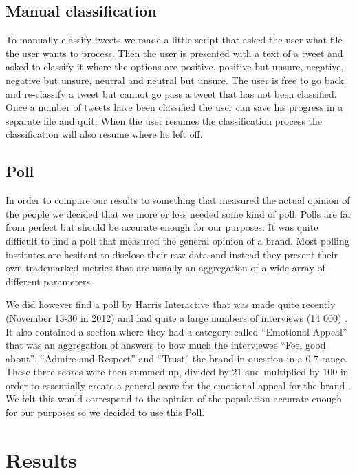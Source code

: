 \documentclass[a4paper,12pt]{report}
\begin{document}
\section{Manual classification}

To manually classify tweets we made a little script that asked the user what file the user wants to process. 
Then the user is presented with a text of a tweet and asked to classify it where the options are positive, positive but unsure, negative, negative but unsure, neutral and neutral but unsure. 
The user is free to go back and re-classify a tweet but cannot go pass a tweet that has not been classified. 
Once a number of tweets have been classified the user can save his progress in a separate file and quit. 
When the user resumes the classification process the classification will also resume where he left off.

\section{Poll}

In order to compare our results to something that measured the actual opinion of the people we decided that we more or less needed some kind of poll. 
Polls are far from perfect but should be accurate enough for our purposes. It was quite difficult to find a poll that measured the general opinion of a brand. 
Most polling institutes are hesitant to disclose their raw data and instead they present their own trademarked metrics that are usually an aggregation of a wide array of different parameters.

We did however find a poll by Harris Interactive that was made quite recently (November 13-30 in 2012) and had quite a large numbers of interviews (14 000) \cite{Harris13}. 
It also contained a section where they had a category called “Emotional Appeal” that was an aggregation of answers to how much the interviewee “Feel good about”, “Admire and Respect” and “Trust” the brand in question in a 0-7 range. 
These three scores were then summed up, divided by 21 and multiplied by 100 in order to essentially create a general score for the emotional appeal for the brand \cite{Harris13}. 
We felt this would correspond to the opinion of the population accurate enough for our purposes so we decided to use this Poll.

\chapter{Results}
\end{document}
